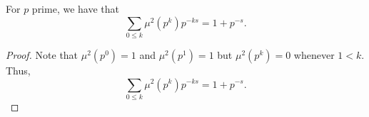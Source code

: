 \begin{theorem}
\label{moebius_sq_tsum_prime_pow}
\leanok
For $p$ prime, we have that
    $$\sum_{0\leq k}\mu^2(p^k)p^{-ks}=1+p^{-s}.$$
\end{theorem}
\begin{proof}
\leanok
Note that $\mu^2(p^0)=1$ and $\mu^2(p^1)=1$ but $\mu^2(p^k)=0$ whenever $1<k$. Thus,
    $$\sum_{0\leq k}\mu^2(p^k)p^{-ks}=1+p^{-s}.$$
\end{proof}
